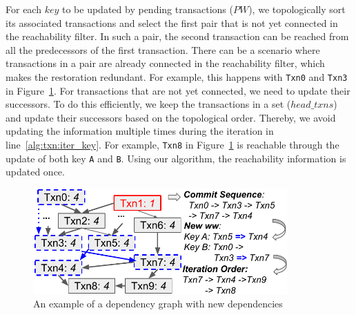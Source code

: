 {For each $key$ to be updated by pending transactions ($PW$), we topologically
sort its associated transactions and select the first pair that is not yet
connected in the reachability filter.
%
In such a pair, the second transaction can be reached from all the predecessors
of the first transaction.
%
There can be a scenario where transactions in a pair are already connected in
the reachability filter, which makes the restoration redundant.
%
For example, this happens with \texttt{Txn0} and \texttt{Txn3} in
Figure~\ref{diagram:txn:impl:restore}.
%
For transactions that are not yet connected, we need to update their
successors.
%
To do this efficiently, we keep the transactions in a set ($head\_txns$) and
update their successors based on the topological order.
%
Thereby, we avoid updating the information multiple times during the iteration
in line~\ref{alg:txn:iter_key}.
%
For example, \texttt{Txn8} in Figure~\ref{diagram:txn:impl:restore} is reachable through
the update of both key \texttt{A} and \texttt{B}.
%
Using our algorithm, the reachability information is updated once.

\begin{figure}
  \centering
	\includegraphics[width=0.87\textwidth]{diagram/txn/impl_dep_graph.pdf}
  \caption{An example of a dependency graph with new  dependencies}
	\label{diagram:txn:impl:restore}
\end{figure}

}
